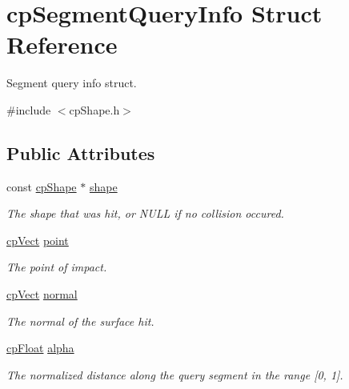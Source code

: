 \hypertarget{structcp_segment_query_info}{}\section{cp\+Segment\+Query\+Info Struct Reference}
\label{structcp_segment_query_info}


Segment query info struct.  




{\ttfamily \#include $<$cp\+Shape.\+h$>$}

\subsection*{Public Attributes}
\begin{DoxyCompactItemize}
\item 
\mbox{\label{structcp_segment_query_info_a1644aedf3beee1c910f0361ff73e50eb}} 
const \mbox{\hyperlink{structcp_shape}{cp\+Shape}} $\ast$ \mbox{\hyperlink{structcp_segment_query_info_a1644aedf3beee1c910f0361ff73e50eb}{shape}}
\begin{DoxyCompactList}\small\item\em The shape that was hit, or N\+U\+LL if no collision occured. \end{DoxyCompactList}\item 
\mbox{\label{structcp_segment_query_info_ac18fb70008b01420c06a407e3d95923a}} 
\mbox{\hyperlink{structcp_vect}{cp\+Vect}} \mbox{\hyperlink{structcp_segment_query_info_ac18fb70008b01420c06a407e3d95923a}{point}}
\begin{DoxyCompactList}\small\item\em The point of impact. \end{DoxyCompactList}\item 
\mbox{\label{structcp_segment_query_info_a453d113d757becaab1363e80c9a54e76}} 
\mbox{\hyperlink{structcp_vect}{cp\+Vect}} \mbox{\hyperlink{structcp_segment_query_info_a453d113d757becaab1363e80c9a54e76}{normal}}
\begin{DoxyCompactList}\small\item\em The normal of the surface hit. \end{DoxyCompactList}\item 
\mbox{\label{structcp_segment_query_info_af5b6ff0d0b32196cf2716e9672604c61}} 
\mbox{\hyperlink{group__basic_types_gac1ed65573e035bf892505768c852d8d3}{cp\+Float}} \mbox{\hyperlink{structcp_segment_query_info_af5b6ff0d0b32196cf2716e9672604c61}{alpha}}
\begin{DoxyCompactList}\small\item\em The normalized distance along the query segment in the range \mbox{[}0, 1\mbox{]}. \end{DoxyCompactList}\end{DoxyCompactItemize}


